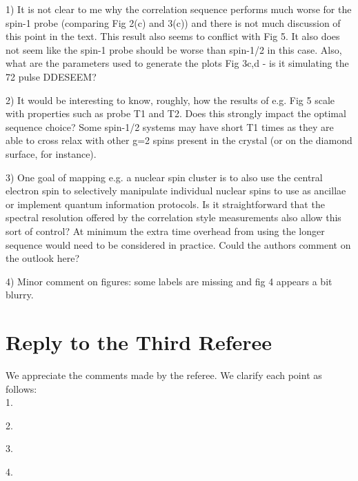 \documentclass[12pt]{amsart}
\begin{document}
	1) It is not clear to me why the correlation sequence performs much
	worse for the spin-1 probe (comparing Fig 2(c) and 3(c)) and there is
	not much discussion of this point in the text. This result also seems
	to conflict with Fig 5. It also does not seem like the spin-1 probe
	should be worse than spin-1/2 in this case. Also, what are the
	parameters used to generate the plots Fig 3c,d - is it simulating the
	72 pulse DDESEEM?
	
	2) It would be interesting to know, roughly, how the results of e.g.
	Fig 5 scale with properties such as probe T1 and T2. Does this
	strongly impact the optimal sequence choice? Some spin-1/2 systems may
	have short T1 times as they are able to cross relax with other g=2
	spins present in the crystal (or on the diamond surface, for
	instance).
	
	3) One goal of mapping e.g. a nuclear spin cluster is to also use the
	central electron spin to selectively manipulate individual nuclear
	spins to use as ancillae or implement quantum information protocols.
	Is it straightforward that the spectral resolution offered by the
	correlation style measurements also allow this sort of control? At
	minimum the extra time overhead from using the longer sequence would
	need to be considered in practice. Could the authors comment on the
	outlook here?
	
	4) Minor comment on figures: some labels are missing and fig 4 appears
	a bit blurry.
	
	\color{black} \section*{ Reply to the Third Referee}
	We appreciate the comments made by the referee. We clarify each point as follows:\\
	1.
	
	2.
	
	3.
	
	4.
\end{document}
